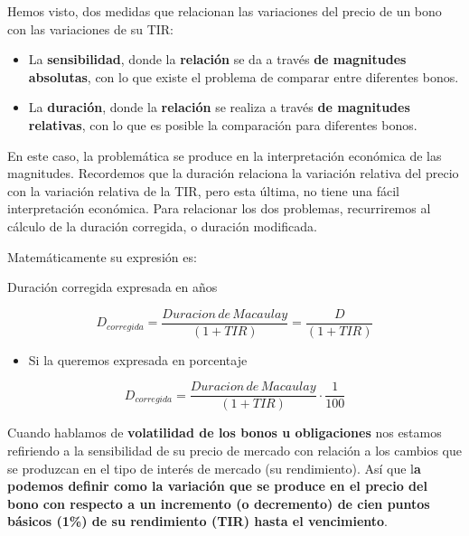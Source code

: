 \documentclass[
  letterpaper,
  DIV=11,
  numbers=noendperiod]{scrreprt}
\providecommand{\tightlist}{%
  \setlength{\itemsep}{0pt}\setlength{\parskip}{0pt}}\usepackage{longtable,booktabs,array}
\begin{document}
\begin{tcolorbox}
Hemos visto, dos medidas que relacionan las variaciones del precio de un
bono con las variaciones de su TIR:

\begin{itemize}
\item
  La \textbf{sensibilidad}, donde la \textbf{relación} se da a través
  \textbf{de magnitudes} \textbf{absolutas}, con lo que existe el
  problema de comparar entre diferentes bonos.
\item
  La \textbf{duración}, donde la \textbf{relación} se realiza a través
  \textbf{de magnitudes relativas}, con lo que es posible la comparación
  para diferentes bonos.
\end{itemize}

En este caso, la problemática se produce en la interpretación económica
de las magnitudes. Recordemos que la duración relaciona la variación
relativa del precio con la variación relativa de la TIR, pero esta
última, no tiene una fácil interpretación económica. Para relacionar los
dos problemas, recurriremos al cálculo de la duración corregida, o
duración modificada.

Matemáticamente su expresión es:

\begin{tcolorbox}[enhanced jigsaw, toprule=.15mm, left=2mm, arc=.35mm, breakable, bottomrule=.15mm, opacityback=0, rightrule=.15mm, leftrule=.75mm, colframe=quarto-callout-note-color-frame, colback=white]
\begin{minipage}[t]{5.5mm}
\textcolor{quarto-callout-note-color}{\faInfo}
\end{minipage}%
\begin{minipage}[t]{\textwidth - 5.5mm}

Duración corregida expresada en años

\[D_{corregida}=\frac{Duracion\,de\, Macaulay}{\left(1+TIR\right)}=\frac{D}{\left(1+TIR\right)} \]

\begin{itemize}
\tightlist
\item
  Si la queremos expresada en porcentaje
\end{itemize}

\[D_{corregida}=\frac{Duracion\,de\, Macaulay}{\left(1+TIR\right)}\cdot\frac{1}{100}\]

\end{minipage}%
\end{tcolorbox}

Cuando hablamos de \textbf{volatilidad de los bonos u obligaciones} nos
estamos refiriendo a la sensibilidad de su precio de mercado con
relación a los cambios que se produzcan en el tipo de interés de mercado
(su rendimiento). Así que l\textbf{a podemos definir como la variación
que se produce en el precio del bono con respecto a un incremento (o
decremento) de cien puntos básicos (1\%) de su rendimiento (TIR) hasta
el vencimiento}.


\end{tcolorbox}
\end{document}
